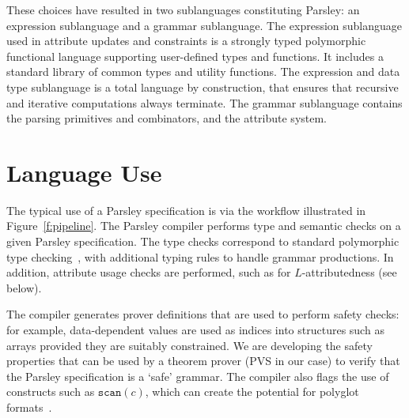 \documentclass[letterpaper]{article}
\begin{document}
These choices have resulted in two sublanguages constituting Parsley:
an expression sublanguage and a grammar sublanguage.  The expression
sublanguage used in attribute updates and constraints is a strongly
typed polymorphic functional language supporting user-defined types
and functions.  It includes a standard library of common types and
utility functions.  The expression and data type sublanguage is a
total language by construction, that ensures that recursive and
iterative computations always terminate.  The grammar sublanguage
contains the parsing primitives and combinators, and the attribute
system.

\section{Language Use}
\label{s:use}

\begin{figure*}[!ht]
  \centering
  \resizebox{10cm}{!}{}
  \caption{Parsley in context.}
  \label{f:pipeline}
\end{figure*}

The typical use of a Parsley specification is via the workflow
illustrated in Figure~\ref{f:pipeline}.  The Parsley compiler performs
type and semantic checks on a given Parsley specification.  The type
checks correspond to standard polymorphic type
checking~\cite{Dunfield13:bidir}\cite{zhao19:bidir}, with additional
typing rules to handle grammar productions.  In addition, attribute
usage checks are performed, such as for $L$-attributedness (see
below).

The compiler generates prover definitions that are used to perform
safety checks: for example, data-dependent values are used as indices
into structures such as arrays provided they are suitably constrained.
We are developing the safety properties that can be used by a theorem
prover (PVS in our case) to verify that the Parsley specification is a
`safe' grammar.  The compiler also flags the use of constructs such as
$\texttt{scan}(c)$, which can create the potential for polyglot
formats~\cite{magazinius:polyglots}.
\end{document}
